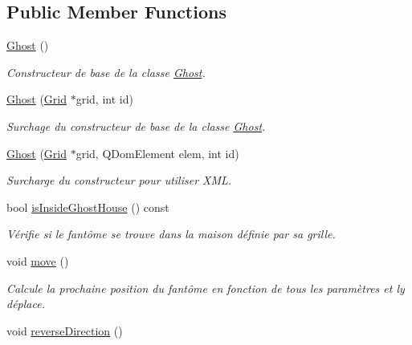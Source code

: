 \subsection*{Public Member Functions}
\begin{DoxyCompactItemize}
\item 
\hyperlink{class_ghost_a2e38d3c0c8546cceb74777b49a8e3bb7}{Ghost} ()
\begin{DoxyCompactList}\small\item\em Constructeur de base de la classe \hyperlink{class_ghost}{Ghost}. \end{DoxyCompactList}\item 
\hyperlink{class_ghost_a08c2db9f738793076d79de784a17708e}{Ghost} (\hyperlink{class_grid}{Grid} $\ast$grid, int id)
\begin{DoxyCompactList}\small\item\em Surchage du constructeur de base de la classe \hyperlink{class_ghost}{Ghost}. \end{DoxyCompactList}\item 
\hyperlink{class_ghost_ad71ada8752f18eaaccb44ef24b3c8718}{Ghost} (\hyperlink{class_grid}{Grid} $\ast$grid, Q\+Dom\+Element elem, int id)
\begin{DoxyCompactList}\small\item\em Surcharge du constructeur pour utiliser X\+M\+L. \end{DoxyCompactList}\item 
bool \hyperlink{class_ghost_af19dd8db51fe675e626785ebe44a0a1b}{is\+Inside\+Ghost\+House} () const 
\begin{DoxyCompactList}\small\item\em Vérifie si le fantôme se trouve dans la maison définie par sa grille. \end{DoxyCompactList}\item 
\hypertarget{class_ghost_a231a741f4efcc40f47bddb7efa61a19d}{}void \hyperlink{class_ghost_a231a741f4efcc40f47bddb7efa61a19d}{move} ()\label{class_ghost_a231a741f4efcc40f47bddb7efa61a19d}

\begin{DoxyCompactList}\small\item\em Calcule la prochaine position du fantôme en fonction de tous les paramètres et l\textquotesingle{}y déplace. \end{DoxyCompactList}\item 
\hypertarget{class_ghost_aea663d057631b7857e05b26205cb2c4b}{}void \hyperlink{class_ghost_aea663d057631b7857e05b26205cb2c4b}{reverse\+Direction} ()\label{class_ghost_aea663d057631b7857e05b26205cb2c4b}


\end{DoxyCompactItemize}
